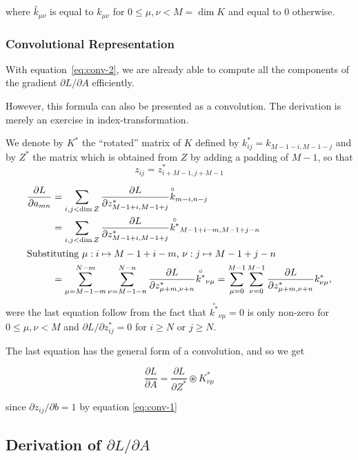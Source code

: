 \documentclass[a4paper,10pt]{article}
\begin{document}
where $\overset{\circ}{k}_{\mu \nu}$ is equal to 
$k_{\mu \nu}$ for $0 \le \mu, \nu < M = \dim K$ and equal 
to $0$ otherwise.

\subsubsection*{Convolutional Representation}

With equation~\ref{eq:conv-2}, we are already able to compute 
all the components of the gradient $\partial L / \partial A$ efficiently.

However, this formula can also be presented as a convolution. 
The derivation is merely an exercise in index-transformation.   

We denote by $K^*$ the ``rotated'' matrix of $K$ defined by 
$k^*_{ij} = k_{M-1-i, M-1-j}$ and by $Z^*$ the matrix which is obtained from $Z$ by 
adding a padding of $M-1$, so that 
\[
    z_{ij} = z^*_{i+M-1, j+M-1}
\]

\begin{align*}
    \frac{\partial L}{\partial a_{mn}} &= 
    \sum_{i,j < \dim Z}
    \frac{\partial L}{\partial z^*_{M-1+i,M-1+j}} \overset{\circ}{k}_{m-i, n-j} \\
    &= \sum_{i,j < \dim Z}
    \frac{\partial L}{\partial z^*_{M-1+i, M-1+j}}
    \overset{\circ}{k^*}_{M-1+i-m, M-1+j-n} \\
    \intertext{Substituting $\mu:  i\mapsto M-1+i-m$, $\nu: j \mapsto M-1+j-n$} 
    &= \sum_{\mu = M-1-m}^{N-m} \sum_{\nu = M-1-n}^{N-n} 
    \frac{\partial L}{\partial z^*_{\mu + m, \nu + n}} \overset{\circ}{k^*}_{\nu \mu} = 
    \sum_{\mu = 0}^{M-1}\sum_{\nu = 0}^{M-1} 
    \frac{\partial L}{\partial z^*_{\mu + m, \nu + n}} k^*_{\nu \mu},
\end{align*}
were the last equation follow from the fact that 
$\overset{\circ}{k^*}_{\nu \mu} = 0$ is only non-zero for $0\le \mu, \nu < M$ and 
$\partial L / \partial z^*_{ij} =0$ for $i \ge N$ or $j \ge N$. 

The last equation has the general form of a convolution, and so we get

\begin{equation}
    \boxed{
    \frac{\partial L}{\partial A} = \frac{\partial L}{\partial Z^*} \circledast K^*_{\nu \mu}
    }
\end{equation}

since $\partial z_{ij} / \partial b = 1$ by equation \ref{eq:conv-1}

\subsection*{Derivation of $\partial L / \partial A$}
\end{document}

